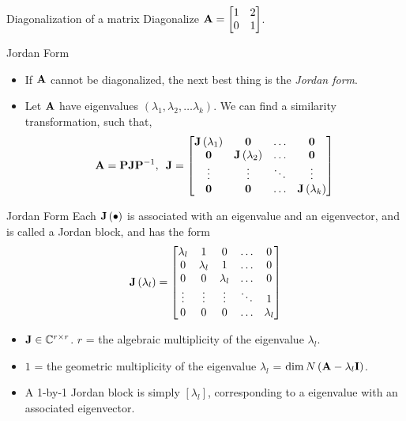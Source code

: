 \documentclass[aspectratio=169]{beamer}
\let\olditem\item
\renewcommand{\item}{\setlength{\itemsep}{\fill}\olditem}
\def\mf{\ensuremath\mathbf}
\def\mb{\ensuremath\mathbb}
\def\bmx{\ensuremath\begin{bmatrix*}[r]}
\def\emx{\ensuremath\end{bmatrix*}}
\begin{document}
\begin{frame}[t]{Diagonalization of a matrix}
Diagonalize $\mf{A} = \bmx 1 & 2\\0 & 1\emx$.
\end{frame}


\begin{frame}[t]{Jordan Form}
\begin{itemize}
    \item If $\mf{A}$ cannot be diagonalized, the next best thing is the \textit{Jordan form}.
    \item Let $\mf{A}$ have eigenvalues $\left(\lambda_1, \lambda_2, \ldots \lambda_k\right)$. We can find a similarity transformation, such that,
    \[ \mf{A} = \mf{P}\mf{J}\mf{P}^{-1}, \,\,\, \mf{J} = \begin{bmatrix*}
    \mf{J}\left(\lambda_1\right) & \mf{0} & \ldots & \mf{0}\\
    \mf{0} & \mf{J}\left(\lambda_2\right) & \ldots & \mf{0}\\
    \vdots & \vdots & \ddots & \vdots\\
    \mf{0} & \mf{0} & \ldots & \mf{J}\left(\lambda_k\right)\\
    \end{bmatrix*} \]
\end{itemize}
\end{frame}


\begin{frame}[t]{Jordan Form}
Each $\mf{J}\left(\bullet\right)$ is associated with an eigenvalue and an eigenvector, and  is called a Jordan block, and has the form
\[ \mf{J}\left(\lambda_l\right) = \begin{bmatrix*}
\lambda_l & 1 & 0 & \ldots & 0 \\
0 & \lambda_l & 1 & \ldots & 0 \\
0 & 0 & \lambda_l & \ldots & 0 \\
\vdots & \vdots & \vdots & \ddots & 1 \\
0 & 0 & 0 & \ldots & \lambda_l \\
\end{bmatrix*} \]

\begin{itemize}
    \item $\mf{J} \in \mb{C}^{r \times r}$. $r$ = the algebraic multiplicity of the eigenvalue $\lambda_l$.
    \item $1$ = the geometric multiplicity of the eigenvalue $\lambda_l$ = $\dim N\left(\mf{A} - \lambda_l\mf{I}\right)$.
    \item A 1-by-1 Jordan block is simply $[\lambda_l]$, corresponding to a eigenvalue with an associated eigenvector.
\end{itemize}
\end{frame}
\end{document}
